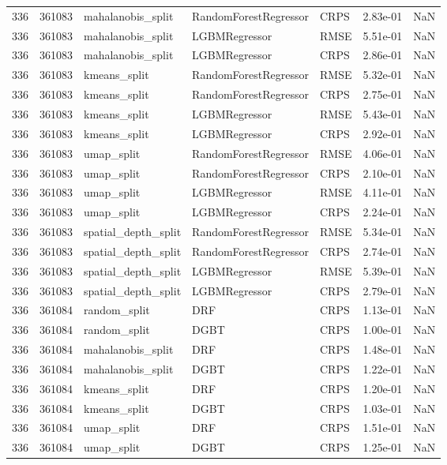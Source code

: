 \begin{tabular}{rrlllrr}
336 & 361083 & mahalanobis\_split & RandomForestRegressor & CRPS & 2.83e-01 & NaN \\
336 & 361083 & mahalanobis\_split & LGBMRegressor & RMSE & 5.51e-01 & NaN \\
336 & 361083 & mahalanobis\_split & LGBMRegressor & CRPS & 2.86e-01 & NaN \\
336 & 361083 & kmeans\_split & RandomForestRegressor & RMSE & 5.32e-01 & NaN \\
336 & 361083 & kmeans\_split & RandomForestRegressor & CRPS & 2.75e-01 & NaN \\
336 & 361083 & kmeans\_split & LGBMRegressor & RMSE & 5.43e-01 & NaN \\
336 & 361083 & kmeans\_split & LGBMRegressor & CRPS & 2.92e-01 & NaN \\
336 & 361083 & umap\_split & RandomForestRegressor & RMSE & 4.06e-01 & NaN \\
336 & 361083 & umap\_split & RandomForestRegressor & CRPS & 2.10e-01 & NaN \\
336 & 361083 & umap\_split & LGBMRegressor & RMSE & 4.11e-01 & NaN \\
336 & 361083 & umap\_split & LGBMRegressor & CRPS & 2.24e-01 & NaN \\
336 & 361083 & spatial\_depth\_split & RandomForestRegressor & RMSE & 5.34e-01 & NaN \\
336 & 361083 & spatial\_depth\_split & RandomForestRegressor & CRPS & 2.74e-01 & NaN \\
336 & 361083 & spatial\_depth\_split & LGBMRegressor & RMSE & 5.39e-01 & NaN \\
336 & 361083 & spatial\_depth\_split & LGBMRegressor & CRPS & 2.79e-01 & NaN \\
336 & 361084 & random\_split & DRF & CRPS & 1.13e-01 & NaN \\
336 & 361084 & random\_split & DGBT & CRPS & 1.00e-01 & NaN \\
336 & 361084 & mahalanobis\_split & DRF & CRPS & 1.48e-01 & NaN \\
336 & 361084 & mahalanobis\_split & DGBT & CRPS & 1.22e-01 & NaN \\
336 & 361084 & kmeans\_split & DRF & CRPS & 1.20e-01 & NaN \\
336 & 361084 & kmeans\_split & DGBT & CRPS & 1.03e-01 & NaN \\
336 & 361084 & umap\_split & DRF & CRPS & 1.51e-01 & NaN \\
336 & 361084 & umap\_split & DGBT & CRPS & 1.25e-01 & NaN \\

\end{tabular}
